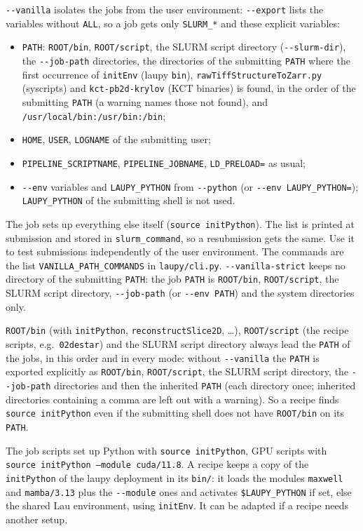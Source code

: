 \documentclass[11pt,a4paper]{article}
\newcommand{\cmd}[1]{\texttt{#1}}
\begin{document}
\cmd{-{}-vanilla} isolates the jobs from the user environment: \cmd{-{}-export} lists the variables
without \cmd{ALL}, so a job gets only \cmd{SLURM\_*} and these explicit variables:
\begin{itemize}
  \item \cmd{PATH}: \cmd{ROOT/bin}, \cmd{ROOT/script}, the SLURM script directory (\cmd{-{}-slurm-dir}),
    the \cmd{-{}-job-path} directories, the directories of the submitting \cmd{PATH} where the first
    occurrence of \cmd{initEnv} (laupy \cmd{bin}), \cmd{rawTiffStructureToZarr.py} (syscripts) and
    \cmd{kct-pb2d-krylov} (KCT binaries) is found, in the order of the submitting \cmd{PATH} (a warning
    names those not found), and \cmd{/usr/local/bin:/usr/bin:/bin};
  \item \cmd{HOME}, \cmd{USER}, \cmd{LOGNAME} of the submitting user;
  \item \cmd{PIPELINE\_SCRIPTNAME}, \cmd{PIPELINE\_JOBNAME}, \cmd{LD\_PRELOAD=} as usual;
  \item \cmd{-{}-env} variables and \cmd{LAUPY\_PYTHON} from \cmd{-{}-python} (or
    \cmd{-{}-env LAUPY\_PYTHON=}); \cmd{LAUPY\_PYTHON} of the submitting shell is not used.
\end{itemize}
The job sets up everything else itself (\cmd{source initPython}). The list is printed at submission
and stored in \cmd{slurm\_command}, so a resubmission gets the same. Use it to test submissions
independently of the user environment. The commands are the list \cmd{VANILLA\_PATH\_COMMANDS} in
\cmd{laupy/cli.py}. \cmd{-{}-vanilla-strict} keeps no directory of the submitting \cmd{PATH}: the job
\cmd{PATH} is \cmd{ROOT/bin}, \cmd{ROOT/script}, the SLURM script directory, \cmd{-{}-job-path} (or
\cmd{-{}-env PATH}) and the system directories only.

\cmd{ROOT/bin} (with \cmd{initPython}, \cmd{reconstructSlice2D}, \ldots), \cmd{ROOT/script} (the
recipe scripts, e.g.\ \cmd{02destar}) and the SLURM script directory always lead the \cmd{PATH} of
the jobs, in this order and in every mode: without \cmd{-{}-vanilla} the \cmd{PATH} is exported
explicitly as \cmd{ROOT/bin}, \cmd{ROOT/script}, the SLURM script directory, the
\cmd{-{}-job-path} directories and then the inherited \cmd{PATH} (each directory once; inherited
directories containing a comma are left out with a warning). So a recipe finds
\cmd{source initPython} even if the submitting shell does not have \cmd{ROOT/bin} on its \cmd{PATH}.

The job scripts set up Python with \cmd{source initPython}, GPU scripts with
\cmd{source initPython --module cuda/11.8}. A recipe keeps a copy of the \cmd{initPython} of the
laupy deployment in its \cmd{bin/}: it loads the modules \cmd{maxwell} and \cmd{mamba/3.13} plus the
\cmd{-{}-module} ones and activates \cmd{\$LAUPY\_PYTHON} if set, else the shared Lau environment,
using \cmd{initEnv}. It can be adapted if a recipe needs another setup.
\end{document}
